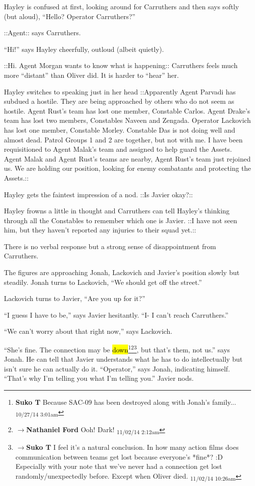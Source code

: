 Hayley is confused at first, looking around for Carruthers and then says softly (but aloud), ``Hello?  Operator Carruthers?''

 {\color[RGB]{153,0,255}::Agent:: } says Carruthers.

``Hi!'' says Hayley cheerfully, outloud (albeit quietly).

 {\color[RGB]{153,0,255}::Hi.  Agent Morgan wants to know what is happening:: } Carruthers feels much more ``distant'' than Oliver did.  It is harder to ``hear'' her.

Hayley switches to speaking just in her head   {\color[RGB]{230,145,56}::Apparently Agent Parvadi has subdued a hostile.  They are being approached by others who do not seem as hostile.  Agent Rust's team has lost one member, Constable Carlos.  Agent Drake's team has lost two members, Constables Naveen and Zengada.  Operator Lackovich has lost one member, Constable Morley.  Constable Das is not doing well and almost dead.  Patrol Groups 1 and 2 are together, but not with me.  I have been requisitioned to Agent Malak's team and assigned to help guard the Assets.  Agent Malak and Agent Rust's teams are nearby, Agent Rust's team just rejoined us.  We are holding our position, looking for enemy combatants and protecting the Assets.::} 

Hayley gets the faintest impression of a nod.  {\color[RGB]{153,0,255} ::Is Javier okay?::} 

Hayley frowns a little in thought and Carruthers can tell Hayley's thinking through all the Constables to remember which one is Javier.   {\color[RGB]{230,145,56}::I have not seen him, but they haven't reported any injuries to their squad yet.::  } 

There is no verbal response but a strong sense of disappointment from Carruthers.



The figures are approaching Jonah, Lackovich and Javier's position slowly but steadily.  Jonah turns to Lackovich, ``We should get off the street.''

Lackovich turns to Javier, ``Are you up for it?''

``I guess I have to be,'' says Javier hesitantly. ``I- I can't reach Carruthers.''

``We can't worry about that right now,'' says Lackovich.

``She's fine.  The connection may be \hl{down}\footnote{\textbf{Suko T }Because SAC-09 has been destroyed along with Jonah's family... \textsubscript{10/27/14 3:01am}}\footnote{$\rightarrow$\textbf{Nathaniel Ford }Ooh! Dark! \textsubscript{11/02/14 2:12am}}\footnote{$\rightarrow$\textbf{Suko T }I feel it's a natural conclusion.  In how many action films does communication between teams get lost because everyone's *fine*? :D  Especially with your note that we've never had a connection get lost randomly/unexpectedly before.  Except when Oliver died. \textsubscript{11/02/14 10:26am}}, but that's them, not us.'' says Jonah.  He can tell that Javier understands what he has to do intellectually but isn't sure he can actually do it.  ``Operator,'' says Jonah, indicating himself. ``That's why I'm telling you what I'm telling you.''  Javier nods.




